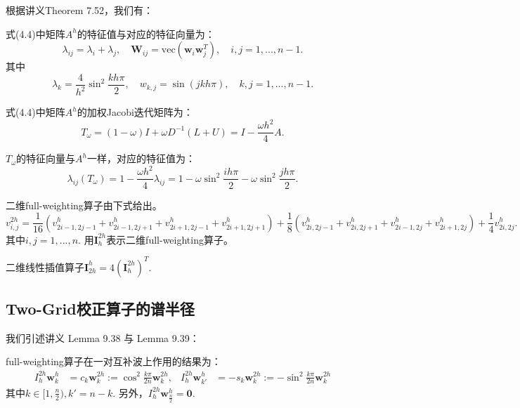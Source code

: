 \documentclass[lang=cn,10pt]{elegantbook}
\begin{document}
根据讲义Theorem 7.52，我们有：
\begin{theorem}
  式(4.4)中矩阵$A^h$的特征值与对应的特征向量为：
  \begin{equation}
    \lambda_{ij}=\lambda_i+\lambda_j,\quad \mathbf{W}_{ij}=\text{vec}(\mathbf{w}_i\mathbf{w}_j^T),\quad i,j=1,...,n-1.
  \end{equation}
  其中
  \begin{equation}
    \lambda_k=\frac{4}{h^2}\sin^2\frac{kh\pi}{2},\quad w_{k,j}=\sin(jkh\pi),\quad k,j=1,...,n-1.
  \end{equation}
\end{theorem}

\begin{lemma}
  式(4.4)中矩阵$A^h$的加权Jacobi迭代矩阵为：
  \begin{equation}
    T_\omega=(1-\omega)I+\omega D^{-1}(L+U)=I-\frac{\omega h^2}{4}A.
  \end{equation}

  $T_\omega$的特征向量与$A^h$一样，对应的特征值为：
  \begin{equation}
    \lambda_{ij}(T_\omega)=1-\frac{\omega h^2}{4}\lambda_{ij}=1-\omega\sin^2\frac{ih\pi}{2}-\omega\sin^2\frac{jh\pi}{2}.
  \end{equation}
\end{lemma}

\begin{definition}
  二维full-weighting算子由下式给出。
  \begin{equation*}
  v^{2h}_{i,j}=\frac{1}{16}(v^h_{2i-1,2j-1}+v^h_{2i-1,2j+1}+v^h_{2i+1,2j-1}+v^h_{2i+1,2j+1})
  +\frac{1}{8}(v^h_{2i,2j-1}+v^h_{2i,2j+1}+v^h_{2i-1,2j}+v^h_{2i+1,2j}) + \frac{1}{4}v^h_{2i,2j}.
  \end{equation*}
  其中$i,j=1,...,n$. 用$\mathbf{I}_h^{2h}$表示二维full-weighting算子。
\end{definition}

\begin{definition}
  二维线性插值算子$\mathbf{I}_{2h}^h=4(\mathbf{I}_h^{2h})^T.$
\end{definition}

\subsection{Two-Grid校正算子的谱半径}

我们引述讲义 Lemma 9.38 与 Lemma 9.39：
\begin{lemma}
  full-weighting算子在一对互补波上作用的结果为：
  \begin{align}
    I_h^{2h} \mathbf{w}_k^h&=c_k\mathbf{w}_k^{2h}:=\cos^2\frac{k\pi}{2n}\mathbf{w}_k^{2h},
    & I_h^{2h} \mathbf{w}_{k'}^h&=-s_k\mathbf{w}_k^{2h}:=-\sin^2\frac{k\pi}{2n}\mathbf{w}_k^{2h}
  \end{align}
  其中$k\in[1,\frac{n}{2}),k'=n-k$. 另外，$I_h^{2h}\mathbf{w}_{\frac{n}{2}}^h=\mathbf{0}$.
\end{lemma}
\end{document}
